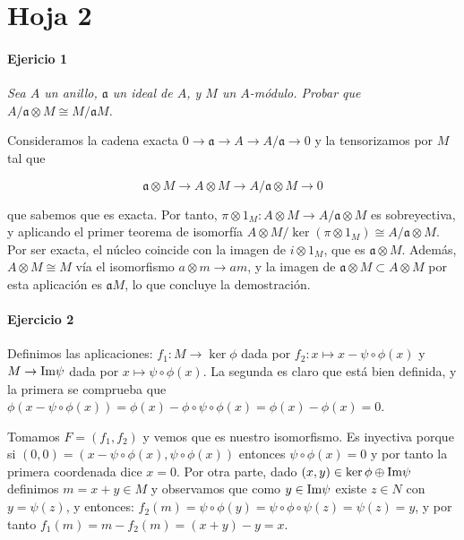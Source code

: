 \documentclass[../main.tex]{subfiles}
\begin{document}
\section{Hoja 2}
\paragraph{Ejericio 1} \textit{ Sea $A$ un anillo, $\mathfrak a$ un ideal de $A$, y $M$ un $A$-módulo. Probar que $A/\mathfrak a \otimes M \cong M/\mathfrak a M $.}

Consideramos la cadena exacta $0\longrightarrow \mathfrak a \longrightarrow A \longrightarrow A/\mathfrak a \longrightarrow 0$ y la tensorizamos por $M$ tal que

\[ \mathfrak a \otimes M \longrightarrow A\otimes M \longrightarrow A/\mathfrak a \otimes M \longrightarrow 0 \]

que sabemos que es exacta. Por tanto, $\pi \otimes 1_M: A \otimes M \to A/\mathfrak a \otimes M $ es sobreyectiva, y aplicando el primer teorema de isomorfía $A \otimes M / \ker (\pi \otimes 1_M) \cong A/\mathfrak a \otimes M $. Por ser exacta, el núcleo coincide con la imagen de $i \otimes 1_M$, que es $\mathfrak a \otimes M$. Además, $A\otimes M \cong M$ vía el isomorfismo $a\otimes m \to am$, y la imagen de $\mathfrak a \otimes M \subset A\otimes M$ por esta aplicación es $\mathfrak a M$, lo que concluye la demostración.

\paragraph{Ejercicio 2}

Definimos las aplicaciones: $f_1:M\to \ker \phi$ dada por $f_2:x\mapsto x-\psi \circ \phi (x)$ y $M\to \text{Im} \psi$ dada por $x\mapsto \psi \circ \phi (x)$. La segunda es claro que está bien definida, y la primera se comprueba que $\phi(x-\psi\circ \phi(x)) = \phi(x)-\phi\circ \psi \circ \phi(x) = \phi(x)-\phi(x) = 0$.

Tomamos $F=(f_1,f_2)$ y vemos que es nuestro isomorfismo. Es inyectiva porque si $(0,0) = (x-\psi \circ \phi (x), \psi \circ \phi (x))$ entonces $\psi \circ \phi (x) = 0$ y por tanto la primera coordenada dice $x=0$. Por otra parte, dado $(x,y)\in \ker \phi \oplus \text{Im} \psi$ definimos $m=x+y \in M$ y observamos que como $y\in \text{Im} \psi$ existe $z\in N$ con $y=\psi(z)$, y entonces: $f_2(m) =  \psi \circ \phi (y) = \psi \circ \phi \circ \psi(z) = \psi (z) = y $, y por tanto $f_1(m) = m - f_2(m) = (x+y)-y = x$.
\end{document}
